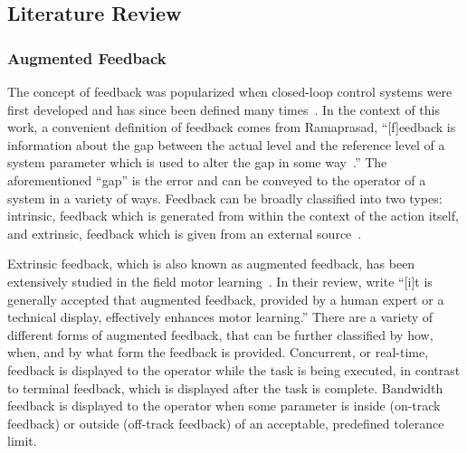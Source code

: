 \subsection{Literature Review}
\subsubsection{Augmented Feedback}
The concept of feedback was popularized when closed-loop control systems were first developed and has since been defined many times~\citep{Wierner1948}.
In the context of this work, a convenient definition of feedback comes from Ramaprasad, ``[f]eedback is information about the gap between the actual level and the reference level of a system parameter which is used to alter the gap in some way~\citep{ramaprasad_definition_1983}.''
The aforementioned ``gap'' is the error and can be conveyed to the operator of a system in a variety of ways.
Feedback can be broadly classified into two types: intrinsic, feedback which is generated from within the context of the action itself, and extrinsic, feedback which is given from an external source~\citep{laurillard_rethinking_2002}.

Extrinsic feedback, which is also known as augmented feedback, has been extensively studied in the field motor learning~\citep{sigrist_augmented_2013}.
In their \citeyear{sigrist_augmented_2013} review, \citeauthor{sigrist_augmented_2013} write ``[i]t is generally accepted that augmented feedback, provided by a human expert or a technical display, effectively enhances motor learning.''
There are a variety of different forms of augmented feedback, that can be further classified by how, when, and by what form the feedback is provided.
Concurrent, or real-time, feedback is displayed to the operator while the task is being executed, in contrast to terminal feedback, which is displayed after the task is complete.
Bandwidth feedback is displayed to the operator when some parameter is inside (on-track feedback) or outside (off-track feedback) of an acceptable, predefined tolerance limit.

